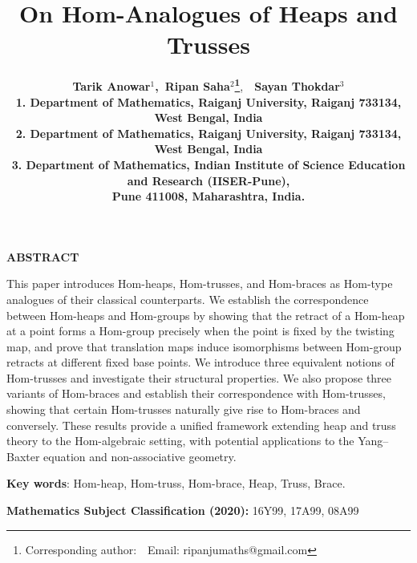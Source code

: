 \documentclass[14pt]{article}
\date{}
\theoremstyle{Definition}
\theoremstyle{remark}
\begin{document}
\renewcommand{\baselinestretch}{1.2}
\renewcommand{\arraystretch}{1.0}
\title{\bf On Hom-Analogues of Heaps and Trusses}
\date{}
\author{{\bf Tarik Anowar$^{1}$,~Ripan Saha$^{2}$\footnote{ Corresponding author:~~Email: ripanjumaths@gmail.com}},~~\bf Sayan Thokdar$^{3}$
        \\
{\small 1.  Department of Mathematics, Raiganj University, Raiganj 733134, West Bengal, India}\\
{\small 2. Department of Mathematics, Raiganj University, Raiganj 733134, West Bengal, India}\\
{\small 3. Department of Mathematics, Indian Institute of Science Education and Research (IISER-Pune)},\\ {\small Pune 411008,  Maharashtra, India.}}

 \maketitle
\begin{center}
\begin{minipage}{12.cm}
\begin{center}{\bf ABSTRACT}\end{center}

This paper introduces Hom-heaps, Hom-trusses, and Hom-braces as Hom-type analogues of their classical counterparts. We establish the correspondence between Hom-heaps and Hom-groups by showing that the retract of a Hom-heap at a point forms a Hom-group precisely when the point is fixed by the twisting map, and prove that translation maps induce isomorphisms between Hom-group retracts at different fixed base points. We introduce three equivalent notions of Hom-trusses and investigate their structural properties. We also propose three variants of Hom-braces and establish their correspondence with Hom-trusses, showing that certain Hom-trusses naturally give rise to Hom-braces and conversely. These results provide a unified framework extending heap and truss theory to the Hom-algebraic setting, with potential applications to the Yang--Baxter equation and non-associative geometry.



\medskip

{\bf Key words}: Hom-heap, Hom-truss, Hom-brace, Heap, Truss, Brace.
\medskip

 {\bf Mathematics Subject Classification (2020):} 16Y99, 17A99, 08A99
\end{minipage}
\end{center}
\normalsize\vskip0.5cm
\end{document}

